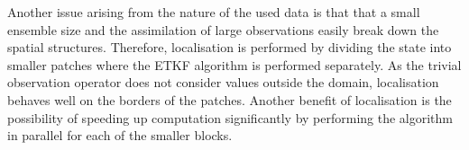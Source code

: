 Another issue arising from the nature of the used data is that that a small ensemble size and the assimilation of large observations easily break down the spatial structures.
Therefore, localisation is performed by dividing the state into smaller patches where the ETKF algorithm is performed separately.
As the trivial observation operator does not consider values outside the domain, localisation behaves well on the borders of the patches.
Another benefit of localisation is the possibility of speeding up computation significantly by performing the algorithm in parallel for each of the smaller blocks.
